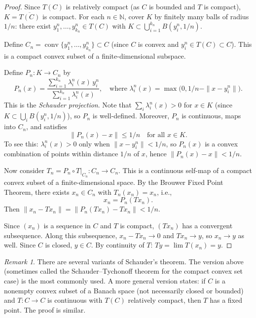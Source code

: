 \documentclass[11pt,a4paper]{article}
\theoremstyle{definition}
\theoremstyle{plain}
\theoremstyle{remark}
\newtheorem{remark}{Remark}[section]
\newcommand{\N}{\mathbb{N}}
\DeclareMathOperator{\conv}{conv}
\begin{document}
\begin{proof}
Since $T(C)$ is relatively compact (as $C$ is bounded and $T$ is compact),
$K = \overline{T(C)}$ is compact. For each $n \in \N$, cover $K$ by finitely
many balls of radius $1/n$: there exist $y_1^n, \ldots, y_{k_n}^n \in T(C)$
with $K \subset \bigcup_{i=1}^{k_n} B(y_i^n, 1/n)$.

Define $C_n = \conv\{y_1^n, \ldots, y_{k_n}^n\} \subset C$ (since $C$ is
convex and $y_i^n \in T(C) \subset C$). This is a compact convex subset of
a finite-dimensional subspace.

Define $P_n \colon K \to C_n$ by
\[
    P_n(x) = \frac{\sum_{i=1}^{k_n} \lambda_i^n(x)\, y_i^n}{\sum_{i=1}^{k_n} \lambda_i^n(x)},
    \quad \text{where } \lambda_i^n(x) = \max\bigl(0, 1/n - \|x - y_i^n\|\bigr).
\]
This is the \emph{Schauder projection}. Note that $\sum_i \lambda_i^n(x) > 0$
for $x \in K$ (since $K \subset \bigcup_i B(y_i^n, 1/n)$), so $P_n$ is
well-defined. Moreover, $P_n$ is continuous, maps into $C_n$, and satisfies
\[
    \|P_n(x) - x\| \leq 1/n \quad \text{for all } x \in K.
\]
To see this: $\lambda_i^n(x) > 0$ only when $\|x - y_i^n\| < 1/n$, so
$P_n(x)$ is a convex combination of points within distance $1/n$ of $x$,
hence $\|P_n(x) - x\| < 1/n$.

Now consider $T_n = P_n \circ T|_{C_n} \colon C_n \to C_n$. This is a
continuous self-map of a compact convex subset of a finite-dimensional space.
By the Brouwer Fixed Point Theorem, there exists $x_n \in C_n$ with
$T_n(x_n) = x_n$, i.e.,
\[
    x_n = P_n(Tx_n).
\]
Then $\|x_n - Tx_n\| = \|P_n(Tx_n) - Tx_n\| < 1/n$.

Since $(x_n)$ is a sequence in $C$ and $T$ is compact, $(Tx_n)$ has a
convergent subsequence. Along this subsequence, $x_n - Tx_n \to 0$ and
$Tx_n \to y$, so $x_n \to y$ as well. Since $C$ is closed, $y \in C$.
By continuity of $T$: $Ty = \lim T(x_n) = y$.
\end{proof}

\begin{remark}\label{rem:schauder-variants}
There are several variants of Schauder's theorem. The version above
(sometimes called the Schauder--Tychonoff theorem for the compact convex
set case) is the most commonly used. A more general version states:
if $C$ is a nonempty convex subset of a Banach space (not necessarily closed
or bounded) and $T \colon C \to C$ is continuous with $T(C)$ relatively
compact, then $T$ has a fixed point. The proof is similar.
\end{remark}
\end{document}

